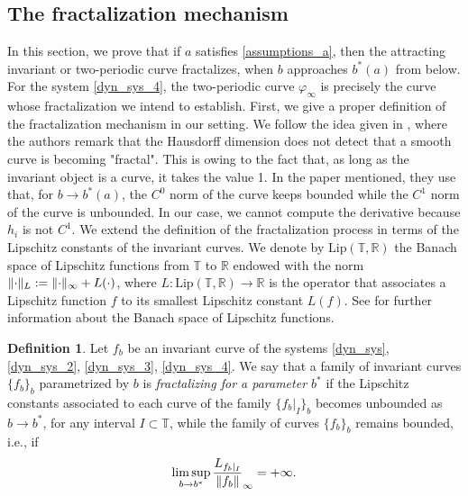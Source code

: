 \documentclass[12pt]{article}
\newcommand{\T}{\mathbb{T}}
\newcommand{\R}{\mathbb{R}}
\theoremstyle{plain}
\theoremstyle{remark}
\DeclarePairedDelimiter\norm{\lVert}{\rVert}
\theoremstyle{definition}
\newtheorem{definition}{Definition}[section]
\begin{document}
\subsection{The fractalization mechanism}\label{fractalization_section}
In this section, we prove that if $a$ satisfies \eqref{assumptions_a}, then the attracting invariant or two-periodic curve fractalizes, when $b$ approaches $b^*(a)$ from below. For the system \eqref{dyn_sys_4}, the two-periodic curve $\varphi_\infty$ is precisely the curve whose fractalization we intend to establish.
First, we give a proper definition of the fractalization mechanism in our setting. We follow the idea given in \cite{jorba2008mechanism}, where the authors remark that the Hausdorff dimension does not detect that a smooth curve is becoming "fractal". This is owing to the fact that, as long as the invariant object is a curve, it takes the value 1. In the paper mentioned, they use that, for $b\to b^*(a)$, the $C^0$ norm of the curve keeps bounded while the $C^1$ norm of the curve is unbounded. In our case, we cannot compute the derivative because $h_{i}$ is not $C^1$. We extend the definition of the fractalization process in terms of the Lipschitz constants of the invariant curves. We denote by $\text{Lip}(\T,\R)$ the Banach space of Lipschitz functions from $\T$ to $\R$ endowed with the norm $\norm{\cdot}_L:=\norm{\cdot}_\infty+L(\cdot)$, where $L:\text{Lip}(\T,\R)\to\R$ is the operator that associates a Lipschitz function $f$ to its smallest Lipschitz constant $L(f)$. See \cite{cobzacs2019lipschitz} for further information about the Banach space of Lipschitz functions.

\begin{definition}
    Let $f_b$ be an invariant curve of the systems \eqref{dyn_sys}, \eqref{dyn_sys_2}, \eqref{dyn_sys_3}, \eqref{dyn_sys_4}. We say that a family of invariant curves $\{f_b\}_b$ parametrized by $b$ is \textit{fractalizing for a parameter $b^*$} if the Lipschitz constants associated to each curve of the family $\{f_b|_I\}_b$ becomes unbounded as $b\to b^*$, for any interval $I\subset\T$, while the family of curves $\{f_b\}_b$ remains bounded, i.e., if
    \begin{align*}
        \limsup_{b\to b^*} \frac{L_{f_b|_I}}{\norm{f_b}}_\infty = +\infty.
    \end{align*}
\end{definition}
\end{document}
